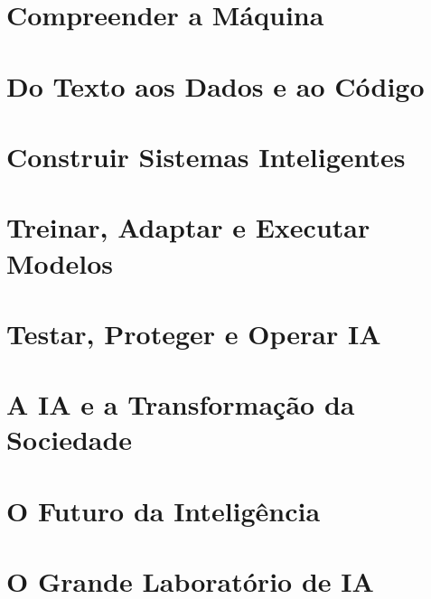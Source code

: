 \part{Compreender a Máquina}
\label{parte:maquina}









\part{Do Texto aos Dados e ao Código}




\part{Construir Sistemas Inteligentes}








\part{Treinar, Adaptar e Executar Modelos}


\part{Testar, Proteger e Operar IA}




\part{A IA e a Transformação da Sociedade}





\part{O Futuro da Inteligência}


\part{O Grande Laboratório de IA}


\appendix



\backmatter
\renewcommand{\bibname}{Bibliografia Científica e Técnica}
\renewcommand{\bibsection}{\chapter*{\bibname}\addcontentsline{toc}{chapter}{\bibname}}



